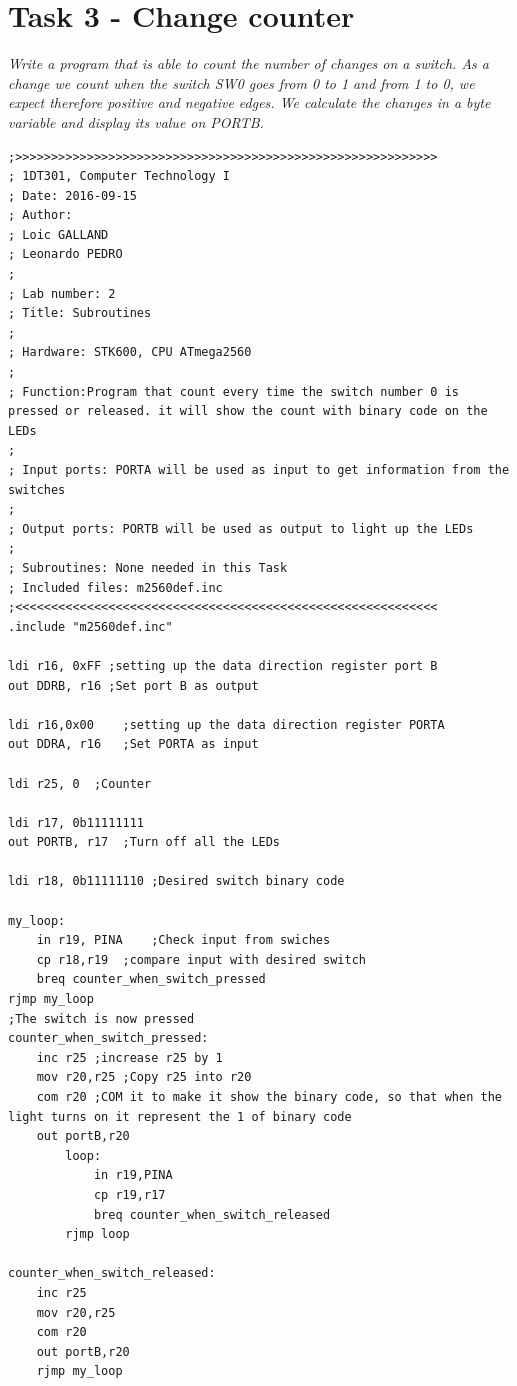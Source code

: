 \documentclass[a4paper,12pt]{article}
\begin{document}
\newpage
\section{Task 3 - Change counter}
\textit{Write a program that is able to count the number of changes on a switch. As a change we count
when the switch SW0 goes from 0 to 1 and from 1 to 0, we expect therefore positive and negative
edges. We calculate the changes in a byte variable and display its value on PORTB.}

\lstset{style=Asm}
\begin{lstlisting}
;>>>>>>>>>>>>>>>>>>>>>>>>>>>>>>>>>>>>>>>>>>>>>>>>>>>>>>>>>>>
; 1DT301, Computer Technology I
; Date: 2016-09-15
; Author:
; Loic GALLAND
; Leonardo PEDRO
;
; Lab number: 2
; Title: Subroutines
;
; Hardware: STK600, CPU ATmega2560
;
; Function:Program that count every time the switch number 0 is pressed or released. it will show the count with binary code on the LEDs
;
; Input ports: PORTA will be used as input to get information from the switches
;
; Output ports: PORTB will be used as output to light up the LEDs
;
; Subroutines: None needed in this Task
; Included files: m2560def.inc
;<<<<<<<<<<<<<<<<<<<<<<<<<<<<<<<<<<<<<<<<<<<<<<<<<<<<<<<<<<<
.include "m2560def.inc"

ldi r16, 0xFF ;setting up the data direction register port B
out DDRB, r16 ;Set port B as output

ldi r16,0x00	;setting up the data direction register PORTA
out DDRA, r16	;Set PORTA as input

ldi r25, 0	;Counter 

ldi r17, 0b11111111
out PORTB, r17	;Turn off all the LEDs

ldi r18, 0b11111110	;Desired switch binary code

my_loop:
	in r19, PINA	;Check input from swiches
	cp r18,r19	;compare input with desired switch
	breq counter_when_switch_pressed
rjmp my_loop
;The switch is now pressed
counter_when_switch_pressed:
	inc r25	;increase r25 by 1
	mov r20,r25	;Copy r25 into r20
	com r20	;COM it to make it show the binary code, so that when the light turns on it represent the 1 of binary code
	out portB,r20
		loop:
			in r19,PINA
			cp r19,r17
			breq counter_when_switch_released
		rjmp loop

counter_when_switch_released:
	inc r25
	mov r20,r25
	com r20
	out portB,r20
	rjmp my_loop
\end{lstlisting}
\end{document}
